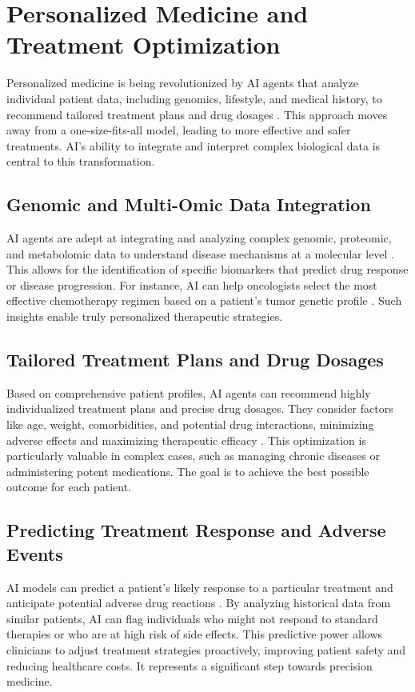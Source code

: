 \documentclass[12pt,a4paper]{article}
\begin{document}
\section{Personalized Medicine and Treatment Optimization}
Personalized medicine is being revolutionized by AI agents that analyze individual patient data, including genomics, lifestyle, and medical history, to recommend tailored treatment plans and drug dosages \cite{saito2015precision}. This approach moves away from a one-size-fits-all model, leading to more effective and safer treatments. AI's ability to integrate and interpret complex biological data is central to this transformation.

\subsection{Genomic and Multi-Omic Data Integration}
AI agents are adept at integrating and analyzing complex genomic, proteomic, and metabolomic data to understand disease mechanisms at a molecular level \cite{fleming2018artificial}. This allows for the identification of specific biomarkers that predict drug response or disease progression. For instance, AI can help oncologists select the most effective chemotherapy regimen based on a patient's tumor genetic profile \cite{campanella2019deep}. Such insights enable truly personalized therapeutic strategies.

\subsection{Tailored Treatment Plans and Drug Dosages}
Based on comprehensive patient profiles, AI agents can recommend highly individualized treatment plans and precise drug dosages. They consider factors like age, weight, comorbidities, and potential drug interactions, minimizing adverse effects and maximizing therapeutic efficacy \cite{topol2019highperformance}. This optimization is particularly valuable in complex cases, such as managing chronic diseases or administering potent medications. The goal is to achieve the best possible outcome for each patient.

\subsection{Predicting Treatment Response and Adverse Events}
AI models can predict a patient's likely response to a particular treatment and anticipate potential adverse drug reactions \cite{wang2019deep}. By analyzing historical data from similar patients, AI can flag individuals who might not respond to standard therapies or who are at high risk of side effects. This predictive power allows clinicians to adjust treatment strategies proactively, improving patient safety and reducing healthcare costs. It represents a significant step towards precision medicine.
\end{document}

